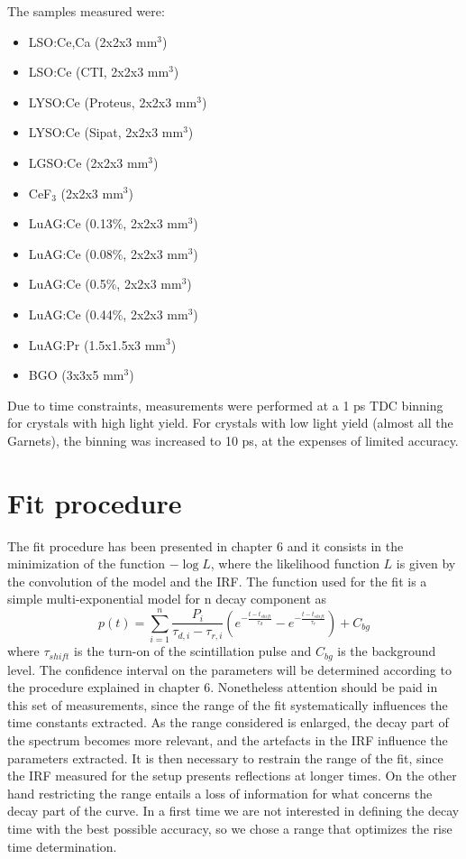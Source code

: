 The samples measured were:
\begin{itemize}
\item LSO:Ce,Ca (2x2x3 mm$^{3}$) 
\item LSO:Ce (CTI, 2x2x3 mm$^{3}$)
\item LYSO:Ce (Proteus, 2x2x3 mm$^{3}$)
\item LYSO:Ce (Sipat, 2x2x3 mm$^{3}$)
\item LGSO:Ce (2x2x3 mm$^{3}$)
\item CeF$_{3}$ (2x2x3 mm$^{3}$)
\item LuAG:Ce (0.13$\%$, 2x2x3 mm$^{3}$)
\item LuAG:Ce (0.08$\%$, 2x2x3 mm$^{3}$)
\item LuAG:Ce (0.5$\%$, 2x2x3 mm$^{3}$) 
\item LuAG:Ce (0.44$\%$, 2x2x3 mm$^{3}$)
\item LuAG:Pr (1.5x1.5x3 mm$^{3}$)
\item BGO (3x3x5 mm$^{3}$)
\end{itemize}
Due to time constraints, measurements were performed at a 1 ps TDC binning for crystals with high light yield. For crystals with low light yield (almost all the Garnets), the binning was increased to 10 ps, at the expenses of limited accuracy.
\section{Fit procedure}
The fit procedure has been presented in chapter 6 and it consists in the minimization of the function $-\log{L}$, where the likelihood function $L$ is given by the convolution of the model and the IRF.
The function used for the fit is a simple multi-exponential model for n decay component as
\begin{equation}
p(t) = \sum _{i = 1}^{n} \frac{P_{i}}{\tau _{d, i} - \tau _{r, i}}\left( e^{-\frac{t-t_{shift}}{\tau _{d}}} - e^{-\frac{t-t_{shift}}{\tau _{r}}} \right) + C_{bg}
\end{equation}
where $\tau _{shift}$ is the turn-on of the scintillation pulse and $C_{bg}$ is the background level.
The confidence interval on the parameters will be determined according to the procedure explained in chapter 6.
Nonetheless attention should be paid in this set of measurements, since the range of the fit systematically influences the time constants extracted. As the range considered is enlarged, the  decay part of the spectrum becomes more relevant, and the artefacts in the IRF influence the parameters extracted. 
It is then necessary to restrain the range of the fit, since the IRF measured for the setup presents reflections at longer times. On the other hand restricting the range  entails a loss of information for what concerns the decay part of the curve. In a first time we are not interested in defining the decay time with the best possible accuracy, so we chose a range that optimizes the rise time determination.

